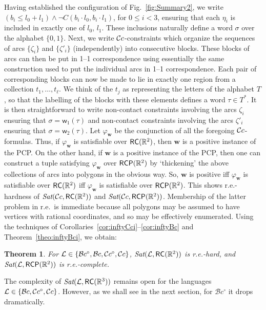 \documentclass{article}
\newtheorem{theorem}{Theorem}
\newcommand{\Sat}{\textit{Sat}}
\newcommand{\cBci}{\ensuremath{\mathcal{B}c^\circ}}
\newcommand{\R}{\mathbb{R}}
\newcommand{\RC}{{\sf RC}}
\newcommand{\RCP}{{\sf RCP}}
\newcommand{\fw}{\mathsf{w}}
\newcommand{\fW}{\mathbf{w}}
\newcommand{\set}[1]{\{#1\}}
\renewcommand{\phi}{\varphi}
\begin{document}
Having established the configuration of Fig.~\ref{fig:Summary2}, we
write $(b_i \leq l_0 + l_1) \wedge \neg C(b_i \cdot l_0, b_i \cdot
l_1)$, for $0\leq i < 3$, ensuring that each $\eta_i$ is included in
exactly one of $l_0$, $l_1$. These inclusions naturally define a word
$\sigma$ over the alphabet $\set{0,1}$.  Next, we write
$\mathcal{C}c$-constraints which organize the sequences of arcs
$\set{\zeta_i}$ and $\set{\zeta'_i}$ (independently) into consecutive
blocks. These blocks of arcs can then be put in 1--1 correspondence
using essentially the same construction used to put the individual
arcs in 1--1 correspondence. Each pair of corresponding blocks can now
be made to lie in exactly one region from a collection $t_1, \ldots,
t_\ell$. We think of the $t_j$ as representing the letters of the
alphabet $T$, so that the labelling of the blocks with these elements
defines a word $\tau \in T^*$. It is then straightforward to write
non-contact constraints involving the arcs $\zeta_i$ ensuring that
$\sigma = \fw_1(\tau)$ and non-contact constraints involving the arcs
$\zeta'_i$ ensuring that $\sigma = \fw_2(\tau)$. Let $\phi_\fW$ be the
conjunction of all the foregoing $\mathcal{C}c$-formulas. Thus, if $\phi_\fW$
is satisfiable over $\RC(\R^2)$, then $\fW$ is a positive instance of
the PCP. On the other hand, if $\fW$ is a positive instance of the
PCP, then one can construct a tuple satisfying $\phi_\fW$ over
$\RCP(\R^2)$ by `thickening' the above collections of arcs into
polygons in the obvious way. So, $\fW$ is positive iff $\phi_\fW$ is
satisfiable over $\RC(\R^2)$ iff $\phi_\fW$ is satisfiable over
$\RCP(\R^2)$. This shows r.e.-hardness of $\Sat(\cBCc,\RC(\R^2))$ and
$\Sat(\cBCc,\RCP(\R^2))$.  Membership of the latter problem in r.e.~is
immediate because all polygons may be assumed to have vertices with
rational coordinates, and so may be effectively enumerated.  Using the
techniques of Corollaries~\ref{cor:inftyCci}--\ref{cor:inftyBc} and
Theorem~\ref{theo:inftyBci}, we obtain:
\begin{theorem}
\label{theo:undecidable}
For $\mathcal{L}\in \{\cBci, \cBc, \cBCci, \cBCc\}$,
$\Sat(\mathcal{L},\RC(\R^2))$ is r.e.-hard, and
$\Sat(\mathcal{L},\RCP(\R^2))$ is r.e.-complete.
\end{theorem}

The complexity of $\Sat(\mathcal{L},\RC(\R^3))$ remains open for the
languages $\mathcal{L}\in \{\mathcal{B}c, \mathcal{C}c^\circ, \mathcal{C}c\}$. However, as we
shall see in the next section, for $\cBci$ it drops dramatically.
\end{document}
